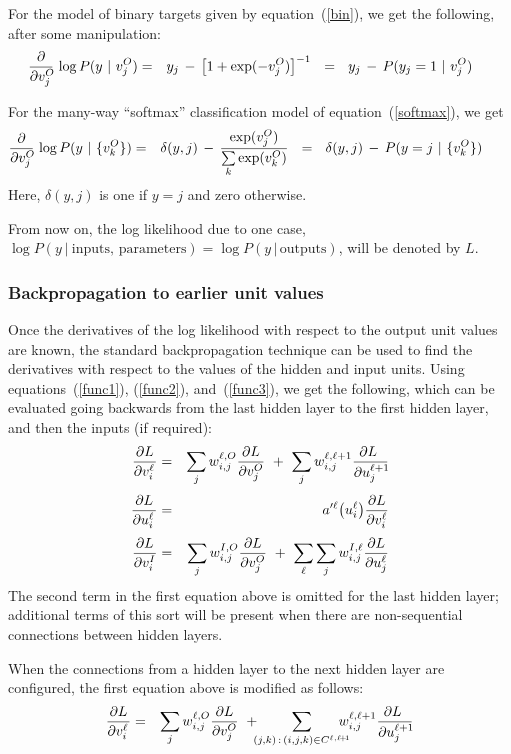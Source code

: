 \documentclass{report}[11pt]
\def\beq{\begin{eqnarray}}
\def\eeq{\end{eqnarray}}
\def\eep{\end{eqnarray}}
\begin{document}
For the model of binary targets given by equation~(\ref{bin}), we
get the following, after some manipulation:\beq
  {\partial \over \partial v^O_j\!}\, \log P(y\ |\ v^O_j) & = &
    y_j\, -\, \big[ 1 + \exp(-v^O_j) \big]^{-1}\ 
    \ =\ \ y_j \,-\, P(y_j=1\ |\ v^O_j)\ \ \ \
\label{bind}\eep

For the many-way ``softmax'' classification model of equation~(\ref{softmax}),
we get\beq
  {\partial \over \partial v^O_j\!}\, \log P(y\ |\ \{v^O_k\}) & = &
    \delta(y,j)\, -\, {\exp(v^O_j) \over \sum\limits_k \exp(v^O_k)}
    \ \ =\ \ \delta(y,j)\, -\, P(y=j\ |\ \{v^O_k\})\ \ \ \ \ \
\label{classd}\eeq%
Here, $\delta(y,j)$ is one if $y=j$ and zero otherwise.  

From now on, the log likelihood due to one case, $\log P(y\ |\
\mbox{inputs},\,\mbox{parameters}) = \log P(y\,|\,\mbox{outputs})$,
will be denoted by $L$.

\subsubsection*{Backpropagation to earlier unit values}

Once the derivatives of the log likelihood with respect to the output
unit values are known, the standard backpropagation technique can be
used to find the derivatives with respect to the values of the hidden
and input units.  Using equations~(\ref{func1}), (\ref{func2}),
and~(\ref{func3}), we get the following, which can be evaluated going
backwards from the last hidden layer to the first hidden layer, and
then the inputs (if required):\beq
  {\partial L \over \partial v^{\ell}_{i\ }\!} & = & 
    \sum_j w^{\ell,O}_{i,j} {\partial L \over \partial v^O_j} \ +\
    \sum_j w^{\ell,\ell+1}_{i,j} {\partial L\ \over \partial u^{\ell+1}_j\! }
    \label{bderiv}\\[3pt]
  {\partial L \over \partial u^{\ell}_{i\ }\!} & = & 
   a'^{\ell}\big(u^{\ell}_i\big) {\partial L \over \partial v^{\ell}_i } 
   \label{aderiv}\\[3pt]
  {\partial L \over \partial v^I_{i\ }\!} & = & 
    \sum_j w^{I,O}_{i,j} {\partial L \over \partial v^O_j}\ +\
    \sum_{\ell} \sum_j w^{I,\ell}_{i,j} {\partial L \over \partial u^{\ell}_j }
\eeq%
The second term in the first equation above is omitted for the last
hidden layer; additional terms of this sort will be present when there
are non-sequential connections between hidden layers.  

When the connections from a hidden layer to the next hidden layer are
configured, the first equation above is modified as follows:\beq
  {\partial L \over \partial v^{\ell}_{i\ }\!} & = & 
    \sum_j w^{\ell,O}_{i,j} {\partial L \over \partial v^O_j} \ +\!\!\!
   \sum_{(j,k)\,:\, (i,j,k)\in C^{\ell,\ell\!+\!1}}\!\!\!\!\!\!    
     w^{\ell,\ell+1}_{i,j} {\partial L\ \over \partial u^{\ell+1}_j\! }
\eeq
\end{document}
